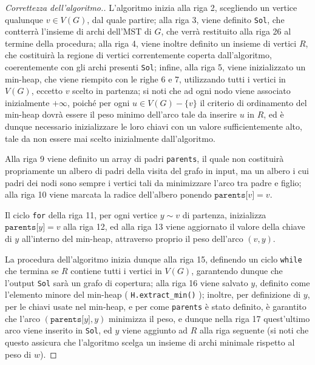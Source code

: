 \documentclass[a4paper, 12pt]{report}
\begin{document}
    \begin{proof}[Correttezza dell'algoritmo.]
        L'algoritmo inizia alla riga 2, scegliendo un vertice qualunque $v \in V(G)$, dal quale partire; alla riga 3, viene definito \texttt{Sol}, che contterrà l'insieme di archi dell'MST di $G$, che verrà restituito alla riga 26 al termine della procedura; alla riga 4, viene inoltre definito un insieme di vertici $R$, che costituirà la regione di vertici correntemente coperta dall'algoritmo, coerentemente con gli archi presenti \texttt{Sol}; infine, alla riga 5, viene inizializzato un min-heap, che viene riempito con le righe 6 e 7, utilizzando tutti i vertici in $V(G)$, eccetto $v$ scelto in partenza; si noti che ad ogni nodo viene associato inizialmente $+ \infty$, poiché per ogni $u \in V(G) - \{v\}$ il criterio di ordinamento del min-heap dovrà essere il peso minimo dell'arco tale da inserire $u$ in $R$, ed è dunque necessario inizializzare le loro chiavi con un valore sufficientemente alto, tale da non essere mai scelto inizialmente dall'algoritmo.

        Alla riga 9 viene definito un array di padri \texttt{parents}, il quale non costituirà propriamente un albero di padri della visita del grafo in input, ma un albero i cui padri dei nodi sono sempre i vertici tali da minimizzare l'arco tra padre e figlio; alla riga 10 viene marcata la radice dell'albero ponendo $\texttt{parents[}v\texttt{]} = v$.

        Il ciclo \texttt{for} della riga 11, per ogni vertice $y \sim v$ di partenza, inizializza $\texttt{parents[}y\texttt{]} = v$ alla riga 12, ed alla riga 13 viene aggiornato il valore della chiave di $y$ all'interno del min-heap, attraverso proprio il peso dell'arco $(v, y)$.

        La procedura dell'algoritmo inizia dunque alla riga 15, definendo un ciclo \texttt{while} che termina se $R$ contiene tutti i vertici in $V(G)$, garantendo dunque che l'output \texttt{Sol} sarà un grafo di copertura; alla riga 16 viene salvato $y$, definito come l'elemento minore del min-heap ( \texttt{H.extract\_min()} ); inoltre, per definizione di $y$, per le chiavi usate nel min-heap, e per come \texttt{parents} è stato definito, è garantito che l'arco $(\texttt{parents[}y\texttt{]}, y)$ minimizza il peso, e dunque nella riga 17 quest'ultimo arco viene inserito in \texttt{Sol}, ed $y$ viene aggiunto ad $R$ alla riga seguente (si noti che questo assicura che l'algoritmo scelga un insieme di archi minimale rispetto al peso di $w$).


\end{proof}
\end{document}
